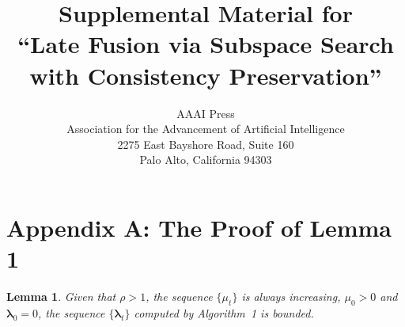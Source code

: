 \documentclass[letterpaper]{article} %
\newtheorem{lemma}{Lemma}
\def\blambda{{\bm \lambda}}
\begin{document}
\title{Supplemental Material for \\``Late Fusion via Subspace Search with Consistency Preservation''}

\author{AAAI Press\\
Association for the Advancement of Artificial Intelligence\\
2275 East Bayshore Road, Suite 160\\
Palo Alto, California 94303\\
}

\maketitle



\section{Appendix A: The Proof of Lemma 1}

\begin{lemma}
Given that $\rho > 1$, the sequence $\{ \mu_{t} \}$ is always increasing, $\mu_{0} > 0$ and $\blambda_{0} = 0$, the sequence $\{ \blambda_{t} \}$ computed by Algorithm~1 is bounded.
\end{lemma}
\end{document}
